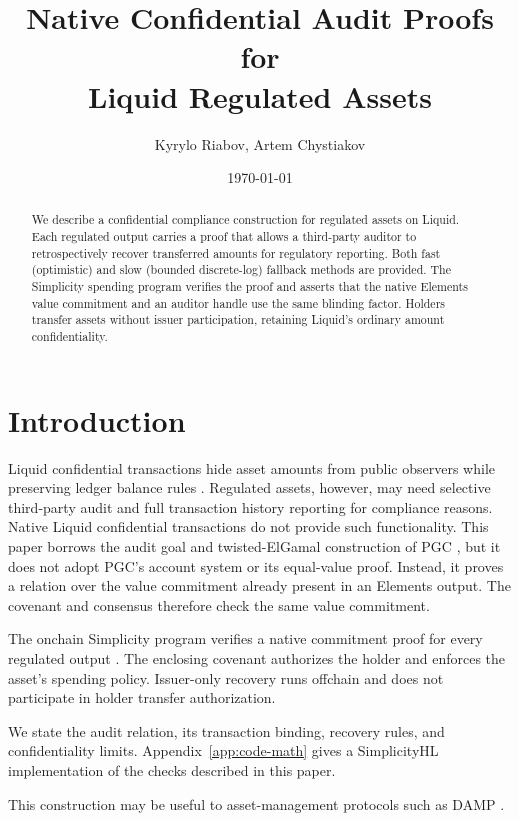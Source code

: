\documentclass[11pt]{article}
\title{Native Confidential Audit Proofs for \\
Liquid Regulated Assets}
\author{Kyrylo Riabov, Artem Chystiakov}
\affil{Blockstream}
\date{\today}
\begin{document}
    \maketitle

    \begin{abstract}
        We describe a confidential compliance construction for regulated assets on Liquid.
        Each regulated output carries a proof that allows a third-party auditor to retrospectively recover transferred amounts for regulatory reporting.
        Both fast (optimistic) and slow (bounded discrete-log) fallback methods are provided.
        The Simplicity spending program verifies the proof and asserts that the native Elements value commitment and an auditor handle use the same blinding factor.
        Holders transfer assets without issuer participation, retaining Liquid's ordinary amount confidentiality.
    \end{abstract}


    \section{Introduction}

    Liquid confidential transactions hide asset amounts from public observers while preserving ledger balance rules \cite{liquid}.
    Regulated assets, however, may need selective third-party audit and full transaction history reporting for compliance reasons.
    Native Liquid confidential transactions do not provide such functionality.
    This paper borrows the audit goal and twisted-ElGamal construction of PGC \cite{pgc}, but it does not adopt PGC's account system or its equal-value proof.
    Instead, it proves a relation over the value commitment already present in an Elements output.
    The covenant and consensus therefore check the same value commitment.

    The onchain Simplicity program verifies a native commitment proof for every regulated output \cite{simplicity}.
    The enclosing covenant authorizes the holder and enforces the asset's spending policy.
    Issuer-only recovery runs offchain and does not participate in holder transfer authorization.

    We state the audit relation, its transaction binding, recovery rules, and confidentiality limits.
    Appendix~\ref{app:code-math} gives a SimplicityHL implementation of the checks described in this paper.

    This construction may be useful to asset-management protocols such as DAMP \cite{damp-paper}.
\end{document}
